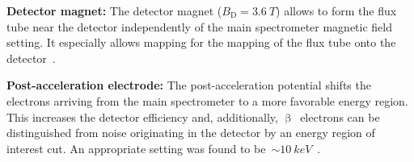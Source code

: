 {\par \textbf{Detector magnet:} The detector magnet ($B_\mathrm{D}=\SI{3.6}{T}$) allows to form the flux tube near the detector independently of the main spectrometer magnetic field setting. It especially allows mapping for the mapping of the flux tube onto the detector~\cite{Amsbaugh2015}.}

{\par \textbf{Post-acceleration electrode:} The post-acceleration potential shifts the electrons arriving from the main spectrometer to a more favorable energy region. This increases the detector efficiency and, additionally, $\upbeta$~electrons can be distinguished from noise originating in the detector by an energy region of interest cut. An appropriate setting was found to be~$\sim\SI{10}{keV}$~\cite{Amsbaugh2015}.}